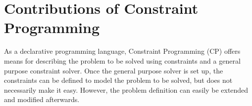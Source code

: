 \section{Contributions of Constraint Programming}
%
%
As a declarative programming language, Constraint Programming (CP) offers means for describing the problem to be solved using constraints and a general purpose constraint solver. Once the general purpose solver is set up, the constraints can be defined to model the problem to be solved, but does not necessarily make it easy. However, the problem definition can easily be extended and modified afterwards.


